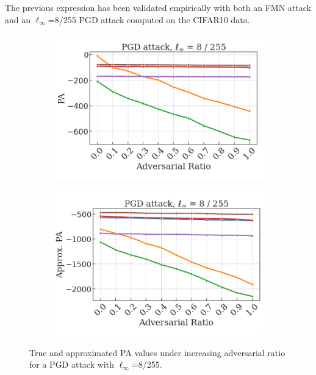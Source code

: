 The previous expression has been validated empirically with both an FMN attack
and an $\ell_{\infty}$=8/255 PGD attack computed on the CIFAR10 data.

\begin{figure}[H]
    \centering
    \begin{subfigure}[b]{0.45\textwidth}
        \centering
        \includegraphics[width=\textwidth]{img/results_discussion/adversarial/pgd_pa_approx.png}
    \end{subfigure}
    \begin{subfigure}[b]{0.45\textwidth}
        \centering
        \includegraphics[width=\textwidth]{img/results_discussion/adversarial/pgd_pa_approx_approx.png}
    \end{subfigure}

    \caption{True and approximated PA values under increasing adversarial ratio for
    a PGD attack with $\ell_\infty$=8/255.}
    \label{fig:appendix_adversarial_approx_pa_pgd}
\end{figure}

